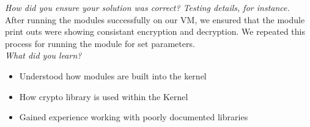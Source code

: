 \documentclass[letterpaper,10pt,titlepage]{article}
\begin{document}
\textit{How did you ensure your solution was correct? Testing details, for instance.}\\

After running the modules successfully on our VM, we ensured that the module print outs were showing consistant encryption and decryption. We repeated this process for running the module for set parameters. \\

\textit{What did you learn?}\\
\begin{itemize}
\item Understood how modules are built into the kernel
\item How crypto library is used within the Kernel
\item Gained experience working with poorly documented libraries
\end{itemize}
\end{document}
